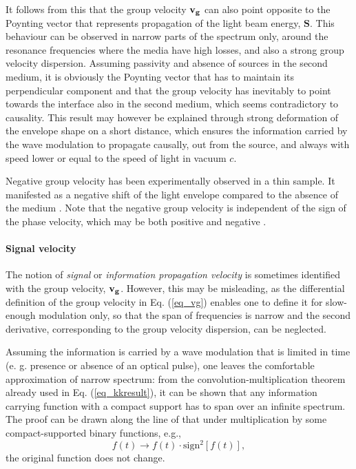 It follows from this that the group velocity ${\mathbf{v_g}}$ can also point opposite to the Poynting vector that represents propagation of the light beam energy, $\mathbf{S}$. 
This behaviour can be observed in narrow parts of the spectrum only, around the resonance frequencies where the media have high losses, and also a strong group velocity dispersion.
Assuming passivity and absence of sources in the second medium, it is obviously the Poynting vector that has to maintain its perpendicular component and that the group velocity has inevitably to point towards the interface also in the second medium, which seems contradictory to causality.
This result 
may however be explained through strong deformation of the envelope shape on a short distance, which ensures the information carried by the wave modulation to propagate causally, out from the source, and always with speed lower or equal to the speed of light in vacuum $c$.

Negative group velocity has been experimentally observed in a thin sample. It manifested as a negative shift of the light envelope compared to the absence of the medium \cite{dolling2006simultaneous}. Note that the negative group velocity is independent of the sign of the phase velocity, which may be both positive and negative \cite{mikki2009electromagnetic}.

\paragraph{Signal velocity}%
The notion of \textit{signal} or \textit{information propagation velocity} is sometimes %
identified with the group velocity, ${\mathbf{v_g}}$. However, this may be misleading, as the differential definition of the group velocity in Eq. (\ref{eq_vg}) enables one to define it for slow-enough modulation only, so that the span of frequencies is narrow and the second derivative, corresponding to the group velocity dispersion, can be neglected.

Assuming the information is carried by a wave modulation that is limited in time (e. g. presence or absence of an optical pulse), one leaves the comfortable approximation of narrow spectrum: from the convolution-multiplication theorem already used in Eq. (\ref{eq_kkresult}), it can be shown that any information carrying function with a compact support has to span over an infinite spectrum. The proof \cite{hill2013uncertainty} can be drawn along the line of that under multiplication by some compact-supported binary functions, e.g., 
$$ f(t) \rightarrow f(t) \cdot \mathrm{sign}^2[f(t)], $$
the original function does not change.

